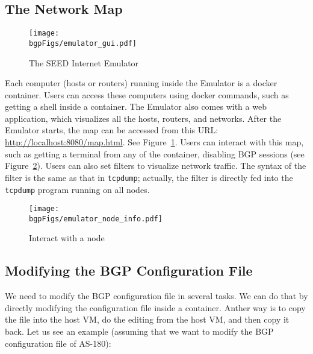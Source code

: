 \subsection{The Network Map}

\begin{figure}[htb]
  \begin{center}
    \texttt{[image: \\bgpFigs/emulator\_gui.pdf]}
  \end{center}
  \caption{The SEED Internet Emulator}
  \label{bgp:fig:emulator-map}
\end{figure}
 

Each computer (hosts or routers) running inside the Emulator is a docker container.
Users can access these computers using docker commands, such as getting a shell
inside a container.
The Emulator also comes with a web application, which visualizes all the hosts, routers,
and networks.
After the Emulator starts, the map can be accessed from this
URL: \url{http://localhost:8080/map.html}.
See Figure~\ref{bgp:fig:emulator-map}.
Users can interact with this map, such as getting a terminal from any of the container,
disabling BGP sessions (see Figure~\ref{bgp:fig:node-info}). 
Users can also set filters to visualize network traffic.
The syntax of the filter is the same as that in \texttt{tcpdump}; actually,
the filter is directly fed into the \texttt{tcpdump} program running on all nodes.


\begin{figure}[htb]
  \begin{center}
    \texttt{[image: \\bgpFigs/emulator\_node\_info.pdf]}
  \end{center}
  \caption{Interact with a node}
  \label{bgp:fig:node-info}
\end{figure}
 

\subsection{Modifying the BGP Configuration File} 

We need to modify the BGP configuration file in several tasks.
We can do that by directly modifying the configuration file
inside a container. Anther way is to copy the file into the host VM,
do the editing from the host VM, and then copy it back. Let us 
see an example (assuming that we want to modify the BGP configuration
file of AS-180):

